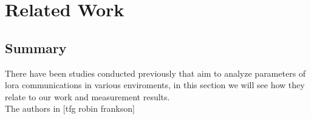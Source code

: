 
\chapter{Related Work}
\label{chap:second}
\ifpdf
    \graphicspath{{Chapter2/Figures/PNG/}{Chapter2/Figures/PDF/}{Chapter1/Figures/}}
\else
    \graphicspath{{Chapter2/Figures/EPS/}{Chapter2/Figures/}}
\fi

\section*{Summary}


There have been studies conducted previously that aim to analyze parameters of lora communications in various enviroments, 
in this section we will see how they relate to our work and measurement results.\\
The authors in [tfg robin frankson] 

\label{sec:sa-temp}
